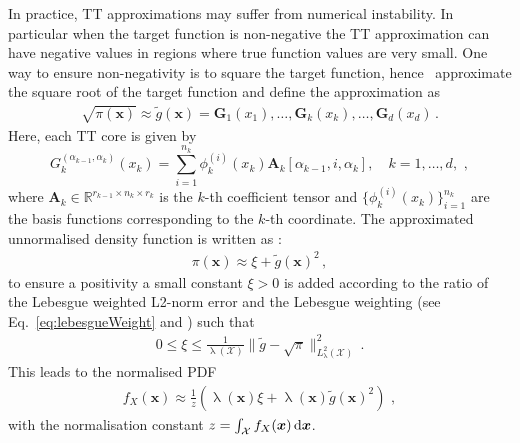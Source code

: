 In practice, TT approximations may suffer from numerical instability.
In particular when the target function is non-negative the TT approximation can have negative values in regions where true function values are very small.
One way to ensure non-negativity is to square the target function, hence~\cite{cui2022deep} approximate the square root of the target function and 
define the approximation as \cite[Eq.~18]{cui2022deep}
\begin{align}
	\sqrt{\pi(\bm{x})} \approx \tilde{g}(\bm{x}) = \bm{G}_1(x_1), \dots, \bm{G}_k(x_k), \dots, \bm{G}_d(x_d)\, .
\end{align}
Here, each TT core is given by \cite[Eq.~21]{cui2022deep}
\begin{equation}
	G^{(\alpha_{k-1},\alpha_k)}_k(x_k) = \sum_{i=1}^{n_k} \phi^{(i)}_k(x_k) \bm{A}_k[\alpha_{k-1}, i, \alpha_k], \quad k = 1, \dots, d,\, \,  ,
\end{equation}
where $\bm{A}_k \in \mathbb{R}^{r_{k-1} \times n_k \times r_k}$ is the $k$-th coefficient tensor and $\{\phi^{(i)}_k(x_k)\}_{i=1}^{n_k}$ are the basis functions corresponding to the $k$-th coordinate.
The approximated unnormalised density function is written as \cite[Eq.~19]{cui2022deep}:
\begin{align}
	\pi(\bm{x}) \approx \xi + \tilde{g}(\bm{x})^2\,  ,
\end{align}
to ensure a positivity a small constant $\xi > 0$ is added according to the ratio of the Lebesgue weighted L2-norm error and the Lebesgue weighting (see Eq.~\ref{eq:lebesgueWeight} and \cite[Eq.~35]{cui2022deep}) such that 
\begin{align}
	0 \leq \xi \leq \frac{1}{\uplambda(\mathcal{X})} \lVert \tilde{g} - \sqrt{\pi} \rVert_{L^2_{\uplambda}(\mathcal{X})}^2\,  \label{eq:gamErr}.
\end{align}
This leads to the normalised PDF \cite[Eq.~19]{cui2022deep}
\begin{align}
	f_X(\bm{x})  \approx \frac{1}{z} \left( \uplambda(\bm{x}) \xi  + \uplambda(\bm{x}) \tilde{g}(\bm{x})^2 \right)\, \, ,
\end{align}
with the normalisation constant $z = \int_{\mathcal{X}} f_X(\bm{x}) \mathop{}\!\mathrm{d} \bm{x} $.
